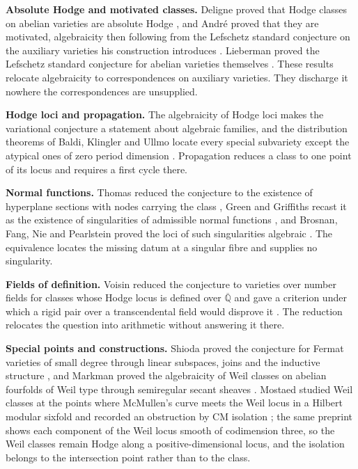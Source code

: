 \documentclass[10pt,twocolumn]{article}
\begin{document}
\textbf{Absolute Hodge and motivated classes.} Deligne proved that Hodge
classes on abelian varieties are absolute Hodge \cite{deligne1982}, and
André proved that they are motivated, algebraicity then following from
the Lefschetz standard conjecture on the auxiliary varieties his
construction introduces \cite{andre1996}. Lieberman proved the Lefschetz
standard conjecture for abelian varieties themselves
\cite{lieberman1968}. These results relocate algebraicity to
correspondences on auxiliary varieties. They discharge it nowhere the
correspondences are unsupplied.

\textbf{Hodge loci and propagation.} The algebraicity of Hodge loci
\cite{cdk1995} makes the variational conjecture a statement about
algebraic families, and the distribution theorems of Baldi, Klingler and
Ullmo locate every special subvariety except the atypical ones of zero
period dimension \cite{bku2024}. Propagation reduces a class to one
point of its locus and requires a first cycle there.

\textbf{Normal functions.} Thomas reduced the conjecture to the
existence of hyperplane sections with nodes carrying the class
\cite{thomas2005}, Green and Griffiths recast it as the existence of
singularities of admissible normal functions \cite{gg2007}, and Brosnan,
Fang, Nie and Pearlstein proved the loci of such singularities algebraic
\cite{bfnp2009}. The equivalence locates the missing datum at a singular
fibre and supplies no singularity.

\textbf{Fields of definition.} Voisin reduced the conjecture to
varieties over number fields for classes whose Hodge locus is defined
over \(\overline{\mathbb{Q}}\) and gave a criterion under which a rigid
pair over a transcendental field would disprove it
\cite{voisin2007,voisin2016}. The reduction relocates the question into
arithmetic without answering it there.

\textbf{Special points and constructions.} Shioda proved the conjecture
for Fermat varieties of small degree through linear subspaces, joins and
the inductive structure \cite{shioda1979,sk1979,dasilva2021}, and
Markman proved the algebraicity of Weil classes on abelian fourfolds of
Weil type through semiregular secant sheaves \cite{markman2025b}.
Mostaed studied Weil classes at the points where McMullen's curve meets
the Weil locus in a Hilbert modular sixfold and recorded an obstruction
by CM isolation \cite{mostaed2026}; the same preprint shows each
component of the Weil locus smooth of codimension three, so the Weil
classes remain Hodge along a positive-dimensional locus, and the
isolation belongs to the intersection point rather than to the class.
\end{document}
